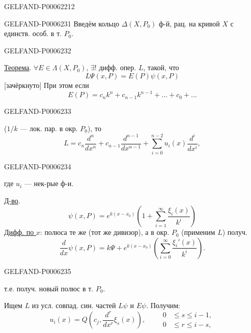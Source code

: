 \begin{GelfandAdjacentEvidence}{GELFAND-P000622}{12}

\end{GelfandAdjacentEvidence}



\begin{GelfandAdjacentEvidence}{GELFAND-P000623}{1}
Введём кольцо \(\Delta(X,P_0)\) ф-й, рац. на кривой \(X\) с единств. особ. в т. \(P_0\).
\end{GelfandAdjacentEvidence}
\begin{GelfandAdjacentEvidence}{GELFAND-P000623}{2}


\underline{Теорема}. \(\forall E\in\Lambda(X,P_0)\), \(\exists!\) дифф. опер. \(L\), такой, что
\[
L\Psi(x,P)=E(P)\psi(x,P)
\]
[зачёркнуто] При этом если
\[
E(P)=c_n k^n+c_{n-1}k^{n-1}+\ldots+c_0+\ldots
\]
\end{GelfandAdjacentEvidence}
\begin{GelfandAdjacentEvidence}{GELFAND-P000623}{3}

(\(1/k\) — лок. пар. в окр. \(P_0\)), то
\[
L=c_n\frac{d^n}{dx^n}+c_{n-1}\frac{d^{n-1}}{dx^{n-1}}+
\sum_{i=0}^{n-2}u_i(x)\frac{d^i}{dx^i},
\]
\end{GelfandAdjacentEvidence}
\begin{GelfandAdjacentEvidence}{GELFAND-P000623}{4}

где \(u_i\) — нек-рые ф-и.

\underline{Д-во}.
\[
\psi(x,P)=e^{k(x-x_0)}\left(1+\sum_{i=1}^\infty\frac{\xi_i(x)}{k^i}\right)
\]
\underline{Дифф. по \(x\)}:
полюса те же (тот же дивизор), а в окр. \(P_0\) (применим \(L\)) получ.
\[
\frac{d}{dx}\psi(x,P)=k\Psi+e^{k(x-x_0)}
\left(\sum_{i=0}^\infty\frac{\xi_i'(x)}{k^i}\right).
\]
\end{GelfandAdjacentEvidence}
\begin{GelfandAdjacentEvidence}{GELFAND-P000623}{5}

т.е. получ. новый полюс в т. \(P_0\).

Ищем \(L\) из усл. совпад. син. частей \(L\psi\) и \(E\psi\).
Получим:
\[
u_i(x)=Q\left(c_j,\frac{d^r}{dx^r}\xi_s(x)\right),\qquad
\begin{aligned}
0&\le s\le i-1,\\
0&\le r\le i-s,
\end{aligned}
\]
\end{GelfandAdjacentEvidence}
